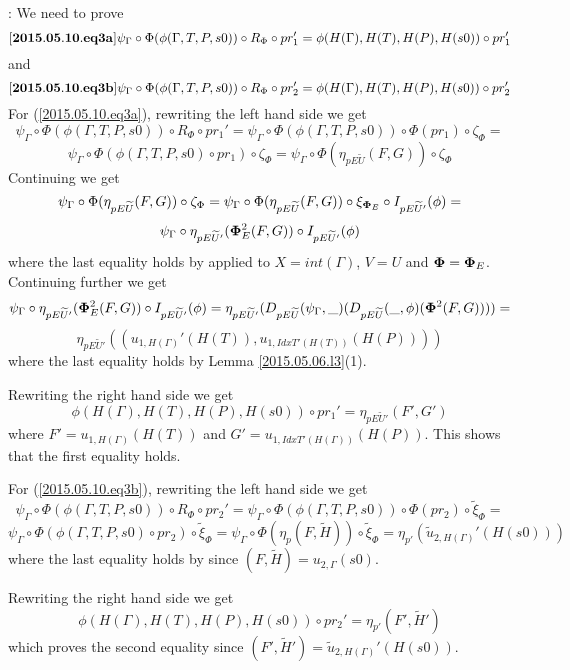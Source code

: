 \documentclass[12pt]{article}
\newenvironment{eq}{\begin{equation}}{\end{equation}}
\newenvironment{myproof}{{\bf Proof}:}{\vskip 5mm }
\newcommand{\llabel}[1]{\label{#1}[{\bf #1}]}
\newcommand{\wt}{\widetilde}
\begin{document}
\begin{myproof}
We need to prove
%
\begin{eq}
\llabel{2015.05.10.eq3a}
\psi_{\Gamma}\circ \Phi(\phi(\Gamma,T,P,s0))\circ R_{\Phi}\circ pr_1' = \phi(H(\Gamma),H(T),H(P),H(s0))\circ pr_1'
\end{eq}
%
and
%
%
\begin{eq}
\llabel{2015.05.10.eq3b}
\psi_{\Gamma}\circ \Phi(\phi(\Gamma,T,P,s0))\circ R_{\Phi}\circ pr_2' = \phi(H(\Gamma),H(T),H(P),H(s0))\circ pr_2'
\end{eq}
%
For (\ref{2015.05.10.eq3a}), rewriting the left hand side we get
%
$$\psi_{\Gamma}\circ \Phi(\phi(\Gamma,T,P,s0))\circ R_{\Phi}\circ pr_1' = \psi_{\Gamma}\circ \Phi(\phi(\Gamma,T,P,s0))\circ\Phi(pr_1)\circ \zeta_{\Phi}=$$
$$\psi_{\Gamma}\circ \Phi(\phi(\Gamma,T,P,s0)\circ pr_1)\circ \zeta_{\Phi}=\psi_{\Gamma}\circ \Phi(\eta_{pE\wt{U}}(F,G))\circ \zeta_{\Phi}$$
%
Continuing we get
%
$$\psi_{\Gamma}\circ \Phi(\eta_{pE\wt{U}}(F,G))\circ \zeta_{\Phi}=\psi_{\Gamma}\circ \Phi(\eta_{pE\wt{U}}(F,G))\circ \xi_{{\bf \Phi}_E}\circ I_{pE\wt{U}'}(\phi)=$$
$$\psi_{\Gamma}\circ\eta_{pE\wt{U}'}({\bf\Phi}^2_E(F,G))\circ I_{pE\wt{U}'}(\phi)$$
%
where the last equality holds by \cite[Lemma 5.8]{fromunivwithPi} applied to $X=int(\Gamma)$, $V=U$ and ${\bf\Phi}={\bf\Phi}_E$. Continuing further we get
%
$$\psi_{\Gamma}\circ\eta_{pE\wt{U}'}({\bf\Phi}^2_E(F,G))\circ I_{pE\wt{U}'}(\phi)=\eta_{pE\wt{U}'}(D_{pE\wt{U}}(\psi_{\Gamma},\_)(D_{pE\wt{U}}(\_,\phi)({\bf\Phi}^2(F,G))))=$$$$\eta_{pE\wt{U}'}((u_{1,H(\Gamma)}'(H(T)),u_{1,IdxT'(H(T))}(H(P))))$$
%
where the last equality holds by Lemma \ref{2015.05.06.l3}(1). 

Rewriting the right hand side we get
%
$$\phi(H(\Gamma),H(T),H(P),H(s0))\circ pr_1'=\eta_{pE\wt{U}'}(F',G')$$
%
where $F'=u_{1,H(\Gamma)}(H(T))$ and $G'=u_{1,IdxT'(H(\Gamma))}(H(P))$. 
This shows that the first equality holds.

For (\ref{2015.05.10.eq3b}), rewriting the left hand side we get
%
$$\psi_{\Gamma}\circ \Phi(\phi(\Gamma,T,P,s0))\circ R_{\Phi}\circ pr_2' = \psi_{\Gamma}\circ \Phi(\phi(\Gamma,T,P,s0))\circ \Phi(pr_2)\circ \wt{\xi}_{\Phi}=$$
$$\psi_{\Gamma}\circ \Phi(\phi(\Gamma,T,P,s0)\circ pr_2)\circ \wt{\xi}_{\Phi}=\psi_{\Gamma}\circ \Phi(\eta_p(F,\wt{H}))\circ \wt{\xi}_{\Phi}=\eta_{p'}(\wt{u}_{2,H(\Gamma)}'(H(s0)))$$
%
where the last equality holds by \cite[Lemma 6.2(2)]{fromunivwithPi} since $(F,\wt{H})=u_{2,\Gamma}(s0)$. 

Rewriting the right hand side we get
%
$$\phi(H(\Gamma),H(T),H(P),H(s0))\circ pr_2'=\eta_{p'}(F',\wt{H}')$$
%
which proves the second equality since $(F',\wt{H}')=\wt{u}_{2,H(\Gamma)}'(H(s0))$.
\end{myproof}






\end{document}

